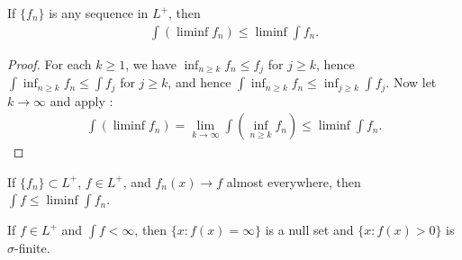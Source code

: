 \begin{lemma}
    If $\{ f_n \}$ is any sequence in $L^+$, then 
    \begin{align}
        \int (\liminf f_n) \le \liminf \int f_n.
    \end{align}
\end{lemma}

\begin{proof}
    For each $k \ge 1$, we have $\inf_{n \ge k} f_n \le f_j$ for $j \ge k$, hence 
    $\int \inf_{n \ge k} f_n \le \int f_j$ for $j \ge k$, and hence $\int \inf_{n \ge k} f_n \le \inf_{j \ge k} \int f_j$.
    Now let $k \to \infty$ and apply :
    \begin{align}
        \int (\liminf f_n) = \lim_{k \to \infty} \int (\inf_{n \ge k} f_n) \le \liminf \int f_n.
    \end{align}
\end{proof}

\begin{corollary}
    If $\{ f_n \} \subset L^+$, $f \in L^+$, and $f_n(x) \to f$ almost everywhere, then $\int f \le \liminf \int f_n$.
\end{corollary}

\begin{proposition}
    If $f \in L^+$ and $\int f < \infty$, then $\{ x: f(x) = \infty \}$ is a null set and $\{ x: f(x) > 0 \}$ is $\sigma$-finite. 
\end{proposition}

